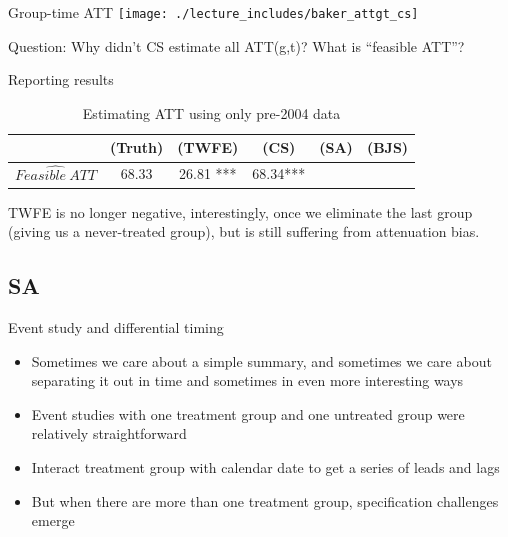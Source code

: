 \documentclass{beamer}
\begin{document}
\begin{frame}{Group-time ATT }
             \texttt{[image: ./lecture\_includes/baker\_attgt\_cs]}

Question: Why didn't CS estimate all ATT(g,t)? What is ``feasible ATT''?

\end{frame}

\begin{frame}{Reporting results}
\begin{table}[htbp]\centering
\small
\caption{Estimating ATT using only pre-2004 data}
\begin{center}
\begin{tabular}{l*{5}{c}}
\hline
\multicolumn{1}{l}{\textbf{}}&
\multicolumn{1}{c}{\textbf{(Truth)}}&
\multicolumn{1}{c}{\textbf{(TWFE)}}&
\multicolumn{1}{c}{\textbf{(CS)}}&
\multicolumn{1}{c}{\textbf{(SA)}}&
\multicolumn{1}{c}{\textbf{(BJS)}}\\
\hline
$\widehat{Feasible\ ATT}$  & 68.33    & 26.81 *** & 68.34*** &&\\
\hline
\end{tabular}
\end{center}
\end{table}

TWFE is no longer negative, interestingly, once we eliminate the last group (giving us a never-treated group), but is still suffering from attenuation bias. 

\end{frame}



\subsection{SA}

\begin{frame}{Event study and differential timing}

\begin{itemize}
\item Sometimes we care about a simple summary, and sometimes we care about separating it out in time and sometimes in even more interesting ways
\item Event studies with one treatment group and one untreated group were relatively straightforward
\item Interact treatment group with calendar date to get a series of leads and lags
\item But when there are more than one treatment group, specification challenges emerge
\end{itemize}

\end{frame}
\end{document}
